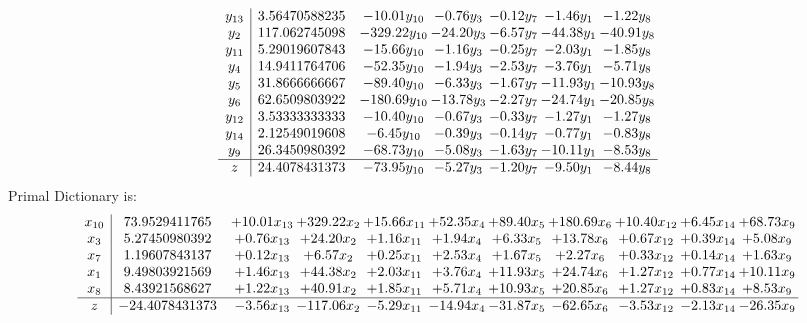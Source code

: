 \documentclass[9pt]{article}
\begin{document}
\[\begin{array}{c| c c@{\hskip 2pt} c@{\hskip 2pt} c@{\hskip 2pt} c@{\hskip 2pt} c@{\hskip 2pt} }
 y_{13}   &  3.56470588235 & -10.01 y_{10} & -0.76 y_{3} & -0.12 y_{7} & -1.46 y_{1} & -1.22 y_{8}\\
 y_{2}   &  117.062745098 & -329.22 y_{10} & -24.20 y_{3} & -6.57 y_{7} & -44.38 y_{1} & -40.91 y_{8}\\
 y_{11}   &  5.29019607843 & -15.66 y_{10} & -1.16 y_{3} & -0.25 y_{7} & -2.03 y_{1} & -1.85 y_{8}\\
 y_{4}   &  14.9411764706 & -52.35 y_{10} & -1.94 y_{3} & -2.53 y_{7} & -3.76 y_{1} & -5.71 y_{8}\\
 y_{5}   &  31.8666666667 & -89.40 y_{10} & -6.33 y_{3} & -1.67 y_{7} & -11.93 y_{1} & -10.93 y_{8}\\
 y_{6}   &  62.6509803922 & -180.69 y_{10} & -13.78 y_{3} & -2.27 y_{7} & -24.74 y_{1} & -20.85 y_{8}\\
 y_{12}   &  3.53333333333 & -10.40 y_{10} & -0.67 y_{3} & -0.33 y_{7} & -1.27 y_{1} & -1.27 y_{8}\\
 y_{14}   &  2.12549019608 & -6.45 y_{10} & -0.39 y_{3} & -0.14 y_{7} & -0.77 y_{1} & -0.83 y_{8}\\
 y_{9}   &  26.3450980392 & -68.73 y_{10} & -5.08 y_{3} & -1.63 y_{7} & -10.11 y_{1} & -8.53 y_{8}\\
\hline
z    &  24.4078431373 & -73.95 y_{10} & -5.27 y_{3} & -1.20 y_{7} & -9.50 y_{1} & -8.44 y_{8}\\
\end{array}\]
Primal Dictionary is:
\[\begin{array}{c| c c@{\hskip 2pt} c@{\hskip 2pt} c@{\hskip 2pt} c@{\hskip 2pt} c@{\hskip 2pt} c@{\hskip 2pt} c@{\hskip 2pt} c@{\hskip 2pt} c@{\hskip 2pt} }
 x_{10}   &  73.9529411765 & + 10.01 x_{13} & + 329.22 x_{2} & + 15.66 x_{11} & + 52.35 x_{4} & + 89.40 x_{5} & + 180.69 x_{6} & + 10.40 x_{12} & +  6.45 x_{14} & + 68.73 x_{9}\\
 x_{3}   &  5.27450980392 & +  0.76 x_{13} & + 24.20 x_{2} & +  1.16 x_{11} & +  1.94 x_{4} & +  6.33 x_{5} & + 13.78 x_{6} & +  0.67 x_{12} & +  0.39 x_{14} & +  5.08 x_{9}\\
 x_{7}   &  1.19607843137 & +  0.12 x_{13} & +  6.57 x_{2} & +  0.25 x_{11} & +  2.53 x_{4} & +  1.67 x_{5} & +  2.27 x_{6} & +  0.33 x_{12} & +  0.14 x_{14} & +  1.63 x_{9}\\
 x_{1}   &  9.49803921569 & +  1.46 x_{13} & + 44.38 x_{2} & +  2.03 x_{11} & +  3.76 x_{4} & + 11.93 x_{5} & + 24.74 x_{6} & +  1.27 x_{12} & +  0.77 x_{14} & + 10.11 x_{9}\\
 x_{8}   &  8.43921568627 & +  1.22 x_{13} & + 40.91 x_{2} & +  1.85 x_{11} & +  5.71 x_{4} & + 10.93 x_{5} & + 20.85 x_{6} & +  1.27 x_{12} & +  0.83 x_{14} & +  8.53 x_{9}\\
\hline
z    &  -24.4078431373 & -3.56 x_{13} & -117.06 x_{2} & -5.29 x_{11} & -14.94 x_{4} & -31.87 x_{5} & -62.65 x_{6} & -3.53 x_{12} & -2.13 x_{14} & -26.35 x_{9}\\
\end{array}\]
\end{document}
